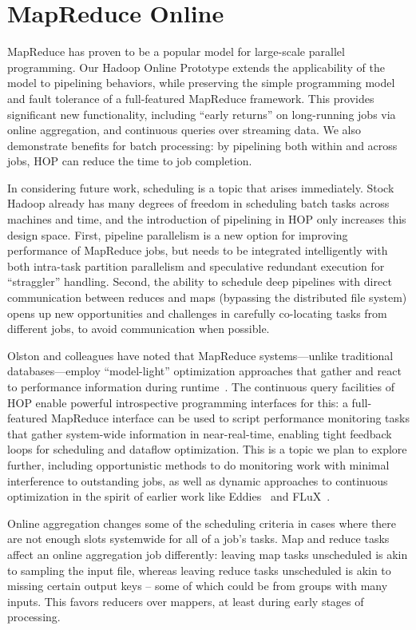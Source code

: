 \section{MapReduce Online}

MapReduce has proven to be a popular model for large-scale parallel programming. 
Our Hadoop Online Prototype extends the applicability of the model to pipelining 
behaviors, while preserving the simple programming model and fault tolerance of a 
full-featured MapReduce framework.  This provides significant new functionality, 
including ``early returns'' on long-running jobs via online aggregation, and continuous 
queries over streaming data.  We also demonstrate benefits for batch processing:  by 
pipelining both within and across jobs, HOP can reduce the time to job completion. 

In considering future work, scheduling is a topic that arises immediately. Stock Hadoop 
already has many degrees of freedom in scheduling batch tasks across machines and time, 
and the introduction of pipelining in HOP only increases this design space.  First, pipeline 
parallelism is a new option for improving performance of MapReduce jobs, but needs to be 
integrated intelligently with both intra-task partition parallelism and speculative redundant 
execution for ``straggler'' handling. Second, the ability to schedule deep pipelines with direct
communication between reduces and maps (bypassing the distributed file system) opens up new 
opportunities and challenges in carefully co-locating tasks from different jobs, to avoid 
communication when possible.  

Olston and colleagues have noted that MapReduce systems---unlike traditional databases---employ ``model-light'' 
optimization approaches that gather and react to performance information during 
runtime~\cite{olston-usenix08}.  The continuous query facilities of HOP enable powerful 
introspective programming interfaces for this: a full-featured MapReduce interface can 
be used to script performance monitoring tasks that gather system-wide information in 
near-real-time, enabling tight feedback loops for scheduling and dataflow optimization. This 
is a topic we plan to explore further, including opportunistic methods to do monitoring work 
with minimal interference to outstanding jobs, as well as dynamic approaches to continuous 
optimization in the spirit of earlier work like Eddies~\cite{eddies} and FLuX~\cite{flux-lb}.

Online aggregation changes some of the scheduling criteria in cases where there are not enough 
slots systemwide for all of a job's tasks.  Map and reduce tasks affect an online aggregation 
job differently: leaving map tasks unscheduled is akin to sampling the input file, whereas leaving 
reduce tasks unscheduled is akin to missing certain output keys -- some of which could be from 
groups with many inputs.  This favors reducers over mappers, at least during early stages of processing.  

